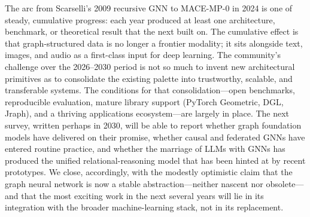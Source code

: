 \documentclass{article}
\begin{document}
The arc from Scarselli's 2009 recursive GNN to MACE-MP-0 in 2024 is one of steady, cumulative progress: each year produced at least one architecture, benchmark, or theoretical result that the next built on. The cumulative effect is that graph-structured data is no longer a frontier modality; it sits alongside text, images, and audio as a first-class input for deep learning. The community's challenge over the 2026--2030 period is not so much to invent new architectural primitives as to consolidate the existing palette into trustworthy, scalable, and transferable systems. The conditions for that consolidation---open benchmarks, reproducible evaluation, mature library support (PyTorch Geometric, DGL, Jraph), and a thriving applications ecosystem---are largely in place. The next survey, written perhaps in 2030, will be able to report whether graph foundation models have delivered on their promise, whether causal and federated GNNs have entered routine practice, and whether the marriage of LLMs with GNNs has produced the unified relational-reasoning model that has been hinted at by recent prototypes. We close, accordingly, with the modestly optimistic claim that the graph neural network is now a stable abstraction---neither nascent nor obsolete---and that the most exciting work in the next several years will lie in its integration with the broader machine-learning stack, not in its replacement.



\end{document}
